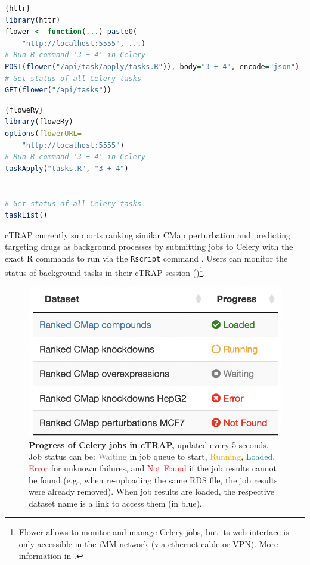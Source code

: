 \noindent\begin{minipage}{.48\textwidth}
\begin{lstlisting}[caption=Job submission with \texttt{httr}.,language=R,label={lst:httr}]{httr}
library(httr)
flower <- function(...) paste0(
    "http://localhost:5555", ...)
# Run R command '3 + 4' in Celery
POST(flower("/api/task/apply/tasks.R")), body="3 + 4", encode="json")
# Get status of all Celery tasks
GET(flower("/api/tasks"))
\end{lstlisting}
\end{minipage}\hfill
\begin{minipage}{.48\textwidth}
\begin{lstlisting}[caption=Job submission with \texttt{floweRy}.,language=R,label={lst:floweRy}]{floweRy}
library(floweRy)
options(flowerURL=
    "http://localhost:5555")
# Run R command '3 + 4' in Celery
taskApply("tasks.R", "3 + 4")


# Get status of all Celery tasks
taskList()
\end{lstlisting}
\end{minipage}

cTRAP currently supports ranking similar CMap perturbation and predicting targeting drugs as background processes by submitting jobs to Celery with the exact R commands to run via the \texttt{Rscript} command \cite{r-core-team:2021wf}. Users can monitor the status of background tasks in their cTRAP session ()\footnote{Flower allows to monitor and manage Celery jobs, but its web interface is only accessible in the iMM network (via ethernet cable or VPN). More information in .}.

\begin{figure}[!ht]
  \includegraphics[width=.5\textwidth]{images/ctrap/job-progress}
  \centering
  \caption[Progress of Celery jobs in cTRAP]{\textbf{Progress of Celery jobs in cTRAP,} updated every 5 seconds. Job status can be: \textcolor{gray}{Waiting} in job queue to start, \textcolor{orange}{Running}, \textcolor{teal}{Loaded}, \textcolor{red}{Error} for unknown failures, and \textcolor{red}{Not Found} if the job results cannot be found (e.g., when re-uploading the same RDS file, the job results were already removed). When job results are loaded, the respective dataset name is a link to access them (in blue).}
  \label{fig:job-progress}
\end{figure}

